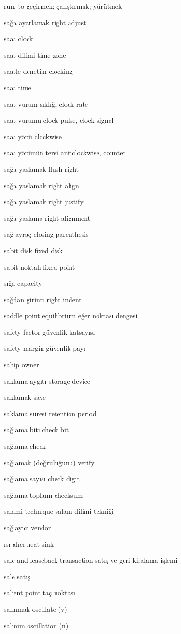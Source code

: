 \documentclass[12pt,fleqn]{article}\usepackage{../../common}
\begin{document}
run, to geçirmek; çalıştırmak; yürütmek

sağa ayarlamak right adjust

saat clock

saat dilimi time zone

saatle denetim clocking

saat time

saat vurum sıklığı clock rate

saat vurumu clock pulse, clock signal

saat yönü clockwise

saat yönünün tersi anticlockwise, counter

sağa yaslamak flush right

sağa yaslamak right align

sağa yaslamak right justify

sağa yaslama right alignment

sağ ayraç closing parenthesis

sabit disk fixed disk

sabit noktalı fixed point

sığa capacity

sağdan girinti right indent

saddle point equilibrium eğer noktası dengesi

safety factor güvenlik katsayısı

safety margin güvenlik payı

sahip owner

saklama aygıtı storage device

saklamak save

saklama süresi retention period

sağlama biti check bit

sağlama check

sağlamak (doğruluğunu) verify

sağlama sayısı check digit

sağlama toplamı checksum

salami technique salam dilimi tekniği

sağlayıcı vendor

ısı alıcı heat sink

sale and leaseback transaction satış ve geri kiralama işlemi

sale satış

salient point taç noktası

salınmak oscillate (v)

salınım oscillation (n)
\end{document}
